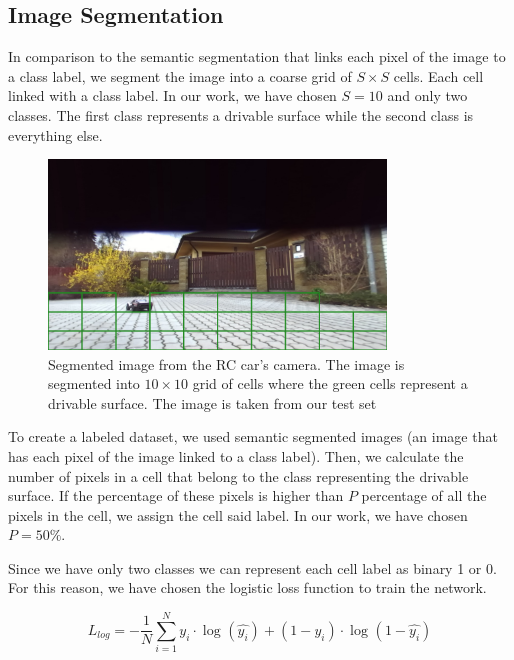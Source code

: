 \documentclass{ctuthesis/ctuthesis}
\begin{document}
\subsection{Image Segmentation}\label{s:Image_Segmentation}
In comparison to the semantic segmentation that links each pixel of the image to a class label, we segment the image into a coarse grid of $S\times S$ cells. Each cell linked with a class label. In our work, we have chosen $S=10$ and only two classes. The first class represents a drivable surface while the second class is everything else. \par


\begin{figure}[h!]
    \centering
    \includegraphics[width=0.8\textwidth]{images/segmented_image.png}
    
    \caption{Segmented image from the RC car's camera. The image is segmented into $10\times 10$ grid of cells where the green cells represent a drivable surface. The image is taken from our test set}\label{f:segmented_image}
\end{figure}

To create a labeled dataset, we used semantic segmented images (an image that has each pixel of the image linked to a class label). Then, we calculate the number of pixels in a cell that belong to the class representing the drivable surface. If the percentage of these pixels is higher than $P$ percentage of all the pixels in the cell, we assign the cell said label. In our work, we have chosen $P=50\%$.\par


Since we have only two classes we can represent each cell label as binary 1 or 0. For this reason, we have chosen the logistic loss function to train the network. \par

\begin{equation}
L_{log} = -\dfrac{1}{N} \sum_{i=1}^{N} y_i \cdot \log_{} (\hat{y_i}) + (1 - y_i) \cdot \log_{} (1-\hat{y_i})
\end{equation}
\end{document}
